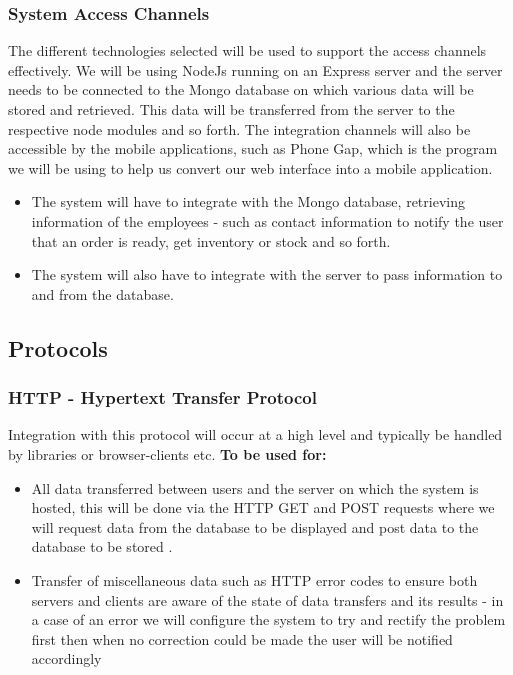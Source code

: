 \documentclass[a4paper,12pt]{article}
\begin{document}
\subsubsection{System Access Channels}
The different technologies selected will be used to support the access channels effectively. We will be using NodeJs running on an Express server and the server needs to be connected to the Mongo database on which various data will be stored and retrieved. This data will be transferred from the server to the respective node modules and so forth. 
The integration channels will also be accessible by the mobile applications, such as Phone Gap, which is the program we will be using to help us convert our web interface into a mobile application.
\begin{itemize}

\item The system will have to integrate with the Mongo database, retrieving information of the employees - such as contact information to notify the user that an order is ready, get inventory or stock and so forth. 

\item The system will also have to integrate with the server to pass information to and from the database.
\end{itemize}

\subsection{Protocols}

\subsubsection{HTTP - Hypertext Transfer Protocol}
Integration with this protocol will occur at a high level and typically be handled by libraries or browser-clients etc.
\textbf{To be used for:	}
	\begin{itemize}
	\item{All data transferred between users and the server on which the system is hosted, this will be done via the HTTP GET 		and POST requests where we will request data from the database  to be displayed and post data to the database 
		to be stored .}
	\item{Transfer of miscellaneous data such as HTTP error codes to ensure both servers and clients are aware of the state 			of data transfers and its results - in a case of an error we will configure the system to try and rectify the problem 	 		first then when no correction could be made the user will be notified accordingly }
	\end{itemize}
\end{document}
